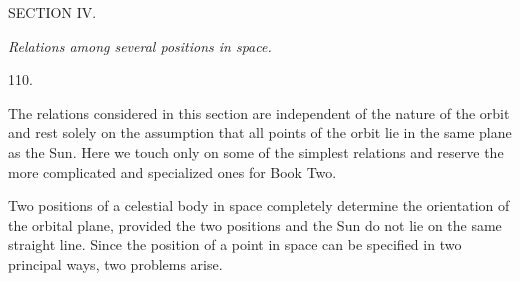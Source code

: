 \clearpage
{}
\begin{center}
{\large SECTION IV.}\par\medskip
\emph{Relations among several positions in space.}\par\bigskip
\hypertarget{native-154-article110}{}110.
\end{center}
The relations considered in this section are independent of the nature of the orbit and rest solely on the assumption that all points of the orbit lie in the same plane as the Sun. Here we touch only on some of the simplest relations and reserve the more complicated and specialized ones for Book Two.

Two positions of a celestial body in space completely determine the orientation of the orbital plane, provided the two positions and the Sun do not lie on the same straight line. Since the position of a point in space can be specified in two principal ways, two problems arise.

